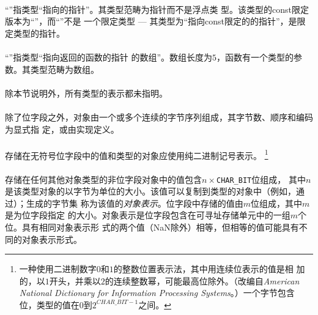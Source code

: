 {\paragraph{}
\ex ``''指类型``指向的指针''。其类型范畴为指针而不是浮点类
型。该类型的const限定版本为``''，而``''不是
一个限定类型 --- 其类型为``指向const限定的的指针''，是限定类型的指针。

\paragraph{}
\ex ``''指类型``指向返回的函数的指针
的数组''。数组长度为$5$，函数有一个类型的参数。其类型范畴为数组。


\paragraph{}
除本节说明外，所有类型的表示都未指明。

\paragraph{}
除了位字段之外，对象由一个或多个连续的字节序列组成，其字节数、顺序和编码为显式指
定，或由实现定义。

\paragraph{}
存储在无符号位字段中的值和类型的对象应使用纯二进制记号表示。
\footnote{一种使用二进制数字$0$和$1$的整数位置表示法，其中用连续位表示的值是相
加的，以$1$开头，并乘以$2$的连续整数幂，可能最高位除外。（改编自\textit{American
National Dictionary for Information Processing Systems}。）一个字节包含
位，类型的值在$0$到$2^{CHAR\_BIT-1}$之间。}

\paragraph{}
存储在任何其他对象类型的非位字段对象中的值包含$n\times$\texttt{CHAR\_BIT}位组成，
其中$n$是该类型对象的以字节为单位的大小。该值可以复制到\tm{unsigned
char[}\tm{]}类型的对象中（例如，通过）；生成的字节集
称为该值的\textit{对象表示}。位字段中存储的值由$m$位组成，其中$m$是为位字段指定
的大小。对象表示是位字段包含在可寻址存储单元中的一组$m$个位。具有相同对象表示形
式的两个值（NaN除外）相等，但相等的值可能具有不同的对象表示形式。

}
